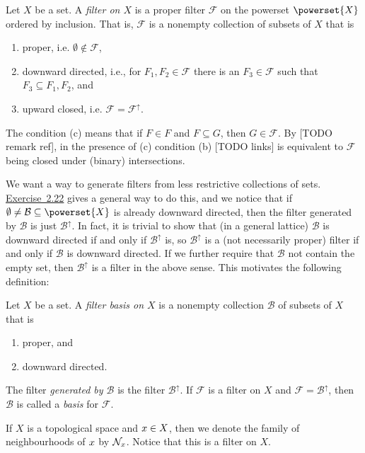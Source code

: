 \documentclass[article, a4paper, 11pt, oneside]{memoir}
\numberwithin{equation}{chapter}
\newcommand{\calB}{\mathcal{B}}
\newcommand{\calF}{\mathcal{F}}
\newcommand{\RNum}[1]{\uppercase\expandafter{\romannumeral #1\relax}}
\newcommand{\exref}[1]{%
    \hyperref[ex:#1]{Exercise~#1}%
}
\theoremstyle{nonumberplain}
\begin{document}
\begin{definition}[Filters]
    Let $X$ be a set. A \emph{filter on $X$} is a proper filter $\calF$ on the powerset $\powerset{X}$ ordered by inclusion. That is, $\calF$ is a nonempty collection of subsets of $X$ that is
    \begin{enumerate}
        \item proper, i.e. $\emptyset \not\in \calF$,
        \item downward directed, i.e., for $F_1, F_2 \in \calF$ there is an $F_3 \in \calF$ such that $F_3 \subseteq F_1, F_2$, and
        \item upward closed, i.e. $\calF = \calF^\uparrow$.
    \end{enumerate}
\end{definition}
%
The condition (c) means that if $F \in F$ and $F \subseteq G$, then $G \in \calF$. By [TODO remark ref], in the presence of (c) condition (b) [TODO links] is equivalent to $\calF$ being closed under (binary) intersections.

We want a way to generate filters from less restrictive collections of sets. \exref{2.22} gives a general way to do this, and we notice that if $\emptyset \neq \calB \subseteq \powerset{X}$ is already downward directed, then the filter generated by $\calB$ is just $\calB^\uparrow$. In fact, it is trivial to show that (in a general lattice) $\calB$ is downward directed if and only if $\calB^\uparrow$ is, so $\calB^\uparrow$ is a (not necessarily proper) filter if and only if $\calB$ is downward directed. If we further require that $\calB$ not contain the empty set, then $\calB^\uparrow$ is a filter in the above sense. This motivates the following definition:

\begin{definition}
    Let $X$ be a set. A \emph{filter basis on $X$} is a nonempty collection $\calB$ of subsets of $X$ that is
    \begin{enumerate}
        \item proper, and
        \item downward directed.
    \end{enumerate}
    The filter \emph{generated by $\calB$} is the filter $\calB^\uparrow$. If $\calF$ is a filter on $X$ and $\calF = \calB^\uparrow$, then $\calB$ is called a \emph{basis} for $\calF$.
\end{definition}

If $X$ is a topological space and $x \in X$, then we denote the family of neighbourhoods of $x$ by $\mathcal{N}_{x}$. Notice that this is a filter on $X$.
\end{document}
